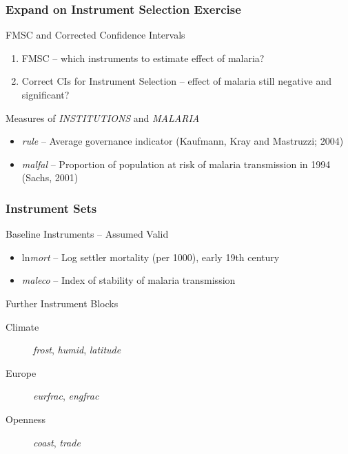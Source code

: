 
\begin{frame}

	\frametitle{Expand on Instrument Selection Exercise}

	\begin{block}{FMSC and Corrected Confidence Intervals}
	
		\begin{enumerate}
			\item FMSC -- which instruments to estimate effect of malaria?
			\item Correct CIs for Instrument Selection -- effect of malaria still negative and significant?
		\end{enumerate}
	\end{block}
	
	\begin{block}{Measures of \emph{INSTITUTIONS} and \emph{MALARIA}}
		\begin{itemize}
			\item \alert{\emph{rule}} -- Average governance indicator (Kaufmann, Kray and Mastruzzi; 2004)
			\item \alert{\emph{malfal}} -- Proportion of population at risk of malaria transmission in 1994 (Sachs, 2001)
		\end{itemize}
	\end{block}
\end{frame}


\begin{frame}

	\frametitle{Instrument Sets}

	\begin{block}{Baseline Instruments -- Assumed Valid}
		\begin{itemize}
			\item \alert{ln\emph{mort}} -- Log settler mortality (per 1000), early 19th century
			\item \alert{\emph{maleco}} --  Index of stability of malaria transmission
		\end{itemize}
	\end{block}

	\begin{block}{Further Instrument Blocks}
		
		\begin{description}
			\item[Climate] \emph{frost}, \emph{humid}, \emph{latitude}
			\item[Europe] \emph{eurfrac}, \emph{engfrac}
			\item[Openness] \emph{coast}, \emph{trade}
		\end{description}
		
	\end{block}
\end{frame}

